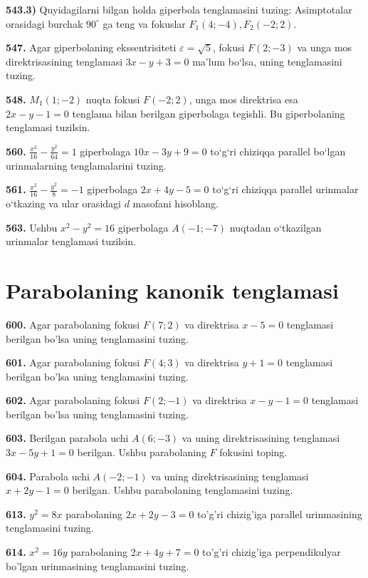 \textbf{543.3)} Quyidagilarni bilgan holda giperbola tenglamasini tuzing: Asimptotalar orasidagi burchak $90^{\circ}$ ga teng va fokuslar $F_1 (4;-4), F_2 (-2; 2) $.

\textbf{547.} Agar giperbolaning ekssentrisiteti $\varepsilon=\sqrt{5}$, fokusi $F (2;-3) $ va unga mos direktrisasining tenglamasi $3 x-y+3=0$ ma’lum bo‘lsa, uning tenglamasini tuzing.

\textbf{548.} $M_1 (1;-2) $ nuqta fokusi $F (-2; 2) $, unga mos direktrisa esa $2x-y-1=0$ tenglama bilan berilgan giperbolaga tegishli. Bu giperbolaning tenglamasi tuzilsin.

\textbf{560.} $\frac{x^2}{16}-\frac{y^2}{64}=1$ giperbolaga $10 x-3 y+9=0$ to‘g‘ri chiziqqa parallel bo‘lgan urinmalarning tenglamalarini tuzing.

\textbf{561.} $\frac{x^2}{16}-\frac{y^2}{8}=-1$ giperbolaga $2 x+4 y-5=0$ to‘g‘ri chiziqqa parallel urinmalar o‘tkazing va ular orasidagi $d$ masofani hisoblang.

\textbf{563.} Ushbu $x^2-y^2=16$ giperbolaga $A (-1;-7)$ nuqtadan o‘tkazilgan urinmalar tenglamasi tuzilsin.



\section{Parabolaning kanonik tenglamasi}



\textbf{600.} Agar parabolaning fokusi $F (7; 2) $ va direktrisa $x-5=0$ tenglamasi berilgan bo'lsa uning tenglamasini tuzing.

\textbf{601.} Agar parabolaning fokusi $F (4;3) $ va direktrisa $y+1=0$ tenglamasi berilgan bo'lsa uning tenglamasini tuzing.

\textbf{602.} Agar parabolaning fokusi $F(2;-1) $ va direktrisa $x-y-1=0$ tenglamasi berilgan bo'lsa uning tenglamasini tuzing.

\textbf{603.} Berilgan parabola uchi $A(6;-3)$ va uning direktrisasining tenglamasi $3x-5y+1=0$ berilgan. Ushbu parabolaning $F$ fokusini toping.


\textbf{604.} Parabola uchi $A(-2;-1)$ va uning direktrisasining tenglamasi $x+2y-1=0$ berilgan. Ushbu parabolaning tenglamasini tuzing.

\textbf{613.} $y^2=8x$ parabolaning $2x+2y-3=0$ to'g'ri chizig'iga parallel urinmasining tenglamasini tuzing.

\textbf{614.} $x^2=16y$ parabolaning $2x+4y+7=0$ to'g'ri chizig'iga perpendikulyar bo'lgan urinmasining tenglamasini tuzing.

